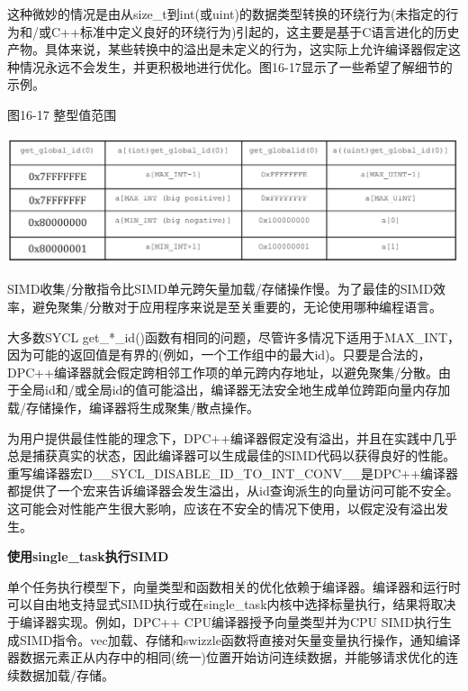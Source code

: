 这种微妙的情况是由从size\_t到int(或uint)的数据类型转换的环绕行为(未指定的行为和/或C++标准中定义良好的环绕行为)引起的，这主要是基于C语言进化的历史产物。具体来说，某些转换中的溢出是未定义的行为，这实际上允许编译器假定这种情况永远不会发生，并更积极地进行优化。图16-17显示了一些希望了解细节的示例。\par

\hspace*{\fill} \par %
图16-17 整型值范围
\begin{center}
	\includegraphics[width=1.0\textwidth]{content/chapter-16/images/12}
\end{center}

SIMD收集/分散指令比SIMD单元跨矢量加载/存储操作慢。为了最佳的SIMD效率，避免聚集/分散对于应用程序来说是至关重要的，无论使用哪种编程语言。\par

大多数SYCL get\_*\_id()函数有相同的问题，尽管许多情况下适用于MAX\_INT，因为可能的返回值是有界的(例如，一个工作组中的最大id)。只要是合法的，DPC++编译器就会假定跨相邻工作项的单元跨内存地址，以避免聚集/分散。由于全局id和/或全局id的值可能溢出，编译器无法安全地生成单位跨距向量内存加载/存储操作，编译器将生成聚集/散点操作。\par

为用户提供最佳性能的理念下，DPC++编译器假定没有溢出，并且在实践中几乎总是捕获真实的状态，因此编译器可以生成最佳的SIMD代码以获得良好的性能。重写编译器宏D\_\_SYCL\_DISABLE\_ID\_TO\_INT\_CONV\_\_是DPC++编译器都提供了一个宏来告诉编译器会发生溢出，从id查询派生的向量访问可能不安全。这可能会对性能产生很大影响，应该在不安全的情况下使用，以假定没有溢出发生。\par

\hspace*{\fill} \par %
\textbf{使用single\_task执行SIMD}

单个任务执行模型下，向量类型和函数相关的优化依赖于编译器。编译器和运行时可以自由地支持显式SIMD执行或在single\_task内核中选择标量执行，结果将取决于编译器实现。例如，DPC++ CPU编译器授予向量类型并为CPU SIMD执行生成SIMD指令。vec加载、存储和swizzle函数将直接对矢量变量执行操作，通知编译器数据元素正从内存中的相同(统一)位置开始访问连续数据，并能够请求优化的连续数据加载/存储。\par

